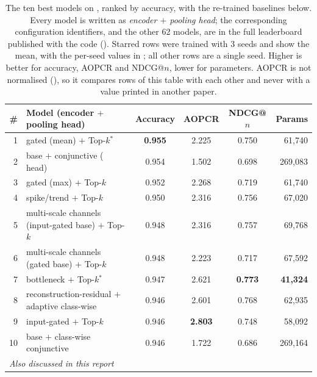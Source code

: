 \begin{table}[tbp]
\caption{The ten best models on \webtraffic{}, ranked by accuracy, with the re-trained baselines
below. Every model is written as \emph{encoder $+$ pooling head}; the corresponding configuration
identifiers, and the other 62 models, are in the full leaderboard published with the code
(). Starred rows were trained with
3 seeds and show the mean, with the per-seed values in ; all other rows are a single
seed. Higher is better for accuracy, AOPCR and NDCG@$n$, lower for parameters. AOPCR is not
normalised (), so it compares rows of this table with each other and never with
a value printed in another paper.}
\label{tab:web_main}
\begin{center}
\footnotesize
\setlength{\tabcolsep}{3.2pt}
\begin{tabular}{rlcccr}
\toprule
\textbf{\#} & \textbf{Model (encoder $+$ pooling head)} & \textbf{Accuracy} & \textbf{AOPCR} &
\textbf{NDCG@$n$} & \textbf{Params} \\
\midrule
1  & \seanet{} gated (mean) $+$ Top-$k$$^\ast$        & \textbf{0.955} & 2.225 & 0.750 & 61{,}740 \\
2  & \seanet{} base $+$ conjunctive (\millet{} head)  & 0.954 & 1.502 & 0.698 & 269{,}083 \\
3  & \seanet{} gated (max) $+$ Top-$k$                & 0.952 & 2.268 & 0.719 & 61{,}740 \\
4  & \seanet{} spike/trend $+$ Top-$k$                & 0.950 & 2.316 & 0.756 & 67{,}020 \\
5  & \seanet{} multi-scale channels (input-gated base) $+$ Top-$k$ & 0.948 & 2.316 & 0.757 & 69{,}768 \\
6  & \seanet{} multi-scale channels (gated base) $+$ Top-$k$ & 0.948 & 2.223 & 0.717 & 67{,}592 \\
7  & \seanet{} bottleneck $+$ Top-$k$$^\ast$          & 0.947 & 2.621 & \textbf{0.773} & \textbf{41{,}324} \\
8  & \seanet{} reconstruction-residual $+$ adaptive class-wise & 0.946 & 2.601 & 0.768 & 62{,}935 \\
9  & \seanet{} input-gated $+$ Top-$k$                & 0.946 & \textbf{2.803} & 0.748 & 58{,}092 \\
10 & \seanet{} base $+$ class-wise conjunctive        & 0.946 & 1.722 & 0.686 & 269{,}164 \\
\midrule
\multicolumn{6}{l}{\emph{Also discussed in this report}}\\

\end{tabular}
\end{center}
\end{table}
